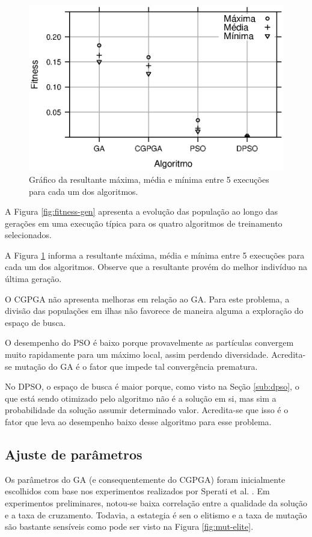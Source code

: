 \begin{figure}[H]
    \centering
    \includegraphics[width=.5\textwidth]{figures/compare}
    \caption{Gráfico da \fitness resultante máxima, média e mínima entre 5 execuções para cada um dos algoritmos.}
    \label{fig:compare}
\end{figure}

\pagebreak

A Figura \ref{fig:fitness-gen} apresenta a evolução das população ao longo das gerações em uma execução típica para os quatro algoritmos de treinamento selecionados.

A Figura \ref{fig:compare} informa a \fitness resultante máxima, média e mínima entre 5 execuções para cada um dos algoritmos. Observe que a \fitness resultante provém do melhor indivíduo na última geração.

O CGPGA não apresenta melhoras em relação ao GA. Para este problema, a divisão das populações em ilhas não favorece de maneira alguma a exploração do espaço de busca.

O desempenho do PSO é baixo porque provavelmente as partículas convergem muito rapidamente para um máximo local, assim perdendo diversidade. Acredita-se mutação do GA é o fator que impede tal convergência prematura.

No DPSO, o espaço de busca é maior porque, como visto na Seção \ref{sub:dpso}, o que está sendo otimizado pelo algoritmo não é a solução em si, mas sim a probabilidade da solução assumir determinado valor. Acredita-se que isso é o fator que leva ao desempenho baixo desse algoritmo para esse problema.

\subsection{Ajuste de parâmetros}

Os parâmetros do GA (e consequentemente do CGPGA) foram inicialmente escolhidos com base nos experimentos realizados por Sperati et al. \cite{sperati2011path}. Em experimentos preliminares, notou-se baixa correlação entre a qualidade da solução e a taxa de cruzamento. Todavia, a estategia é sen o elitismo e a taxa de mutação são bastante sensíveis como pode ser visto na Figura \ref{fig:mut-elite}.

